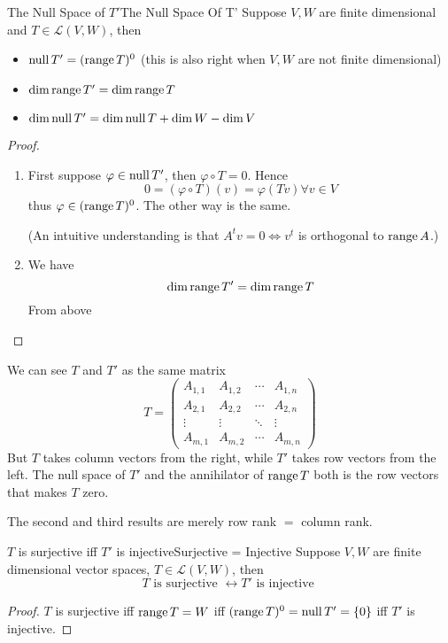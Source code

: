 \documentclass[../main.tex]{subfiles}
\begin{document}
\begin{theorem}{The Null Space of $T'$}{The Null Space Of T'}
Suppose $V,W$ are finite dimensional and $T\in \mathscr{L}(V,W)$, then
\begin{itemize}
	\item $\operatorname{null} T' = (\operatorname{range} T)^0$ (this is also right when $V,W$ are not finite dimensional)
	\item $\dim\operatorname{range} T'=\dim\operatorname{range} T$
	\item $\dim\operatorname{null} T' = \dim\operatorname{null} T+\dim W-\dim V$
\end{itemize}
\end{theorem}
\begin{proof}
\begin{enumerate}
	\item First suppose $\varphi\in \operatorname{null} T'$, then $\varphi\circ T=0$. Hence
		\begin{equation*}
		0=(\varphi\circ T)(v) = \varphi(Tv) \forall v\in V
		\end{equation*}
		thus $\varphi\in(\operatorname{range} T)^0$. The other way is the same.

		(An intuitive understanding is that $A^tv=0 \Leftrightarrow v^t$ is orthogonal to $\operatorname{range} A$.)
	\item We have
		 \begin{equation*}
		\dim\operatorname{range} T'=\dim\operatorname{range} T
		\end{equation*}
		From above
\end{enumerate}
\end{proof}
\begin{remark}
We can see $T$ and $T'$ as the same matrix 
\begin{equation*}
T = 
\begin{pmatrix}
A_{1,1} & A_{1,2} & \cdots & A_{1,n}\\
A_{2,1} & A_{2,2} & \cdots & A_{2,n}\\
\vdots & \vdots & \ddots & \vdots \\
A_{m,1} & A_{m,2} & \cdots & A_{m,n}
\end{pmatrix}
\end{equation*}
But $T$ takes column vectors from the right, while $T'$ takes row vectors from the left. The null space of $T'$ and the annihilator of $\operatorname{range} T$ both is the row vectors that makes $T$ zero.

The second and third results are merely row rank $=$ column rank.
\end{remark}

\begin{theorem}{$T$ is surjective iff $T'$ is injective}{Surjective = Injective}
Suppose $V,W$ are finite dimensional vector spaces, $T\in \mathscr{L}(V,W)$, then
\begin{equation*}
T \text{ is surjective } \leftrightarrow T' \text{ is injective }
\end{equation*}
\end{theorem}
\begin{proof}
$T$ is  surjective iff $\operatorname{range} T=W$ iff $(\operatorname{range} T)^0 = \operatorname{null} T' = \left\{ 0 \right\}$ iff $T'$ is injective.
\end{proof}
\end{document}
